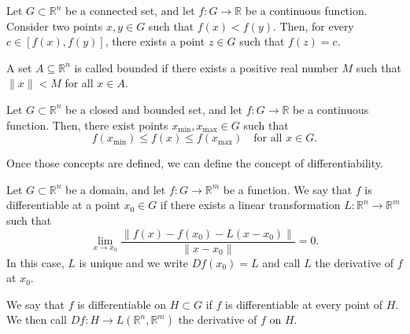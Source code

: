 \begin{teo}
    Let $G\subset \mathbb{R}^n$ be a connected set, and let $f : G \to \mathbb{R}$ be a continuous function. Consider two points $x, y \in G$ such that $f(x) < f(y)$. Then, for every $c\in \left[f(x), f(y)\right]$, there exists a point $z \in G$ such that $f(z) = c$.
\end{teo}

\begin{definicion}
    A set $A \subseteq \mathbb{R}^n$ is called bounded if there exists a positive real number $M$ such that $\|x\| < M$ for all $x \in A$.
\end{definicion}

\begin{teo}
    Let $G\subset \mathbb{R}^n$ be a closed and bounded set, and let $f : G \to \mathbb{R}$ be a continuous function. Then, there exist points $x_{\min}, x_{\max} \in G$ such that
    \[
        f(x_{\min}) \leq f(x) \leq f(x_{\max}) \quad \text{for all } x \in G.
    \]
\end{teo}

Once those concepts are defined, we can define the concept of differentiability.
\begin{definicion}[Differentiability]
    Let $G\subset \mathbb{R}^n$ be a domain, and let $f : G \to \mathbb{R}^m$ be a function. We say that $f$ is differentiable at a point $x_0 \in G$ if there exists a linear transformation $L : \mathbb{R}^n \to \mathbb{R}^m$ such that
    \[
        \lim_{x \to x_0} \frac{\|f(x) - f(x_0) - L(x - x_0)\|}{\|x - x_0\|} = 0.
    \]
    In this case, $L$ is unique and we write $Df(x_0) = L$ and call $L$ the derivative of $f$ at $x_0$.

    We say that $f$ is differentiable on $H\subset G$ if $f$ is differentiable at every point of $H$. We then call $Df : H \to L(\mathbb{R}^n, \mathbb{R}^m)$ the derivative of $f$ on $H$.
\end{definicion}

